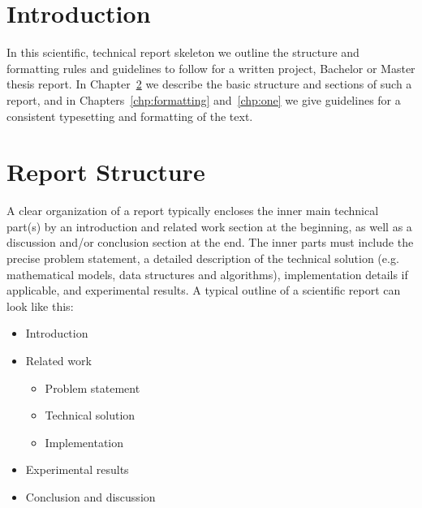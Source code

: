 \documentclass[11pt, a4paper,oneside,chapterprefix=false]{scrbook}
\begin{document}



\tableofcontents

\mainmatter


\chapter{Introduction} \label{chp:introduction}

In this scientific, technical report skeleton we outline the structure and formatting rules and guidelines to follow for a written project, Bachelor or Master thesis report. In Chapter~\ref{chp:structure} we describe the basic structure and sections of such a report, and in Chapters~\ref{chp:formatting} and~\ref{chp:one} we give guidelines for a consistent typesetting and formatting of the text.


\chapter{Report Structure} \label{chp:structure}

A clear organization of a report typically encloses the inner main technical part(s) by an introduction and related work section at the beginning, as well as a discussion and/or conclusion section at the end. The inner parts must include the precise problem statement, a detailed description of the technical solution (e.g. mathematical models, data structures and algorithms), implementation details if applicable, and experimental results. A typical outline of a scientific report can look like this:

\begin{itemize}
\item Introduction
\item Related work
\begin{itemize}
\item Problem statement
\item Technical solution
\item Implementation
\end{itemize}
\item Experimental results
\item Conclusion and discussion
\end{itemize}
\end{document}
